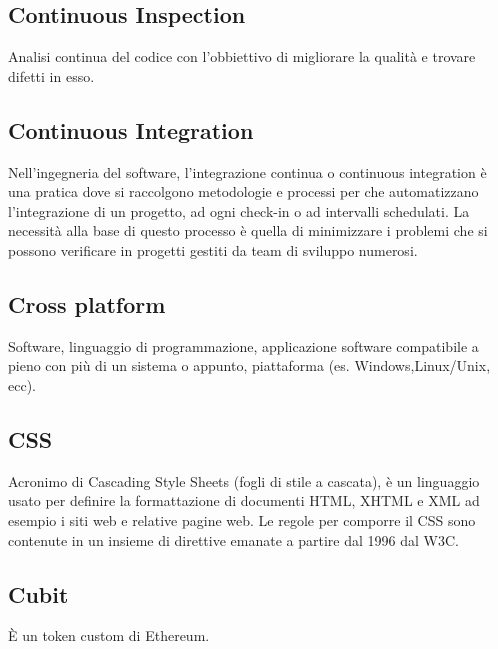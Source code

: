 \subsection{Continuous Inspection}
Analisi continua del codice con l'obbiettivo di migliorare la qualità e trovare difetti in esso.

\subsection{Continuous Integration}
Nell'ingegneria del software, l'integrazione continua o continuous integration è una pratica dove si raccolgono metodologie e processi per che automatizzano l’integrazione di un progetto, ad ogni check-in o ad intervalli schedulati. La necessità alla base di questo processo è quella di minimizzare i problemi che si possono verificare in progetti gestiti da team di sviluppo numerosi.

\subsection{Cross platform}
Software, linguaggio di programmazione, applicazione software compatibile a pieno con più di un sistema o appunto, piattaforma (es. Windows,Linux/Unix, ecc).

\subsection{CSS}
Acronimo di Cascading Style Sheets (fogli di stile a cascata), è un linguaggio usato per definire la formattazione di documenti HTML, XHTML e XML ad esempio i siti web e relative pagine web. Le regole per comporre il CSS sono contenute in un insieme di direttive emanate a partire dal 1996 dal W3C.

\subsection{Cubit}
È un token custom di Ethereum.
